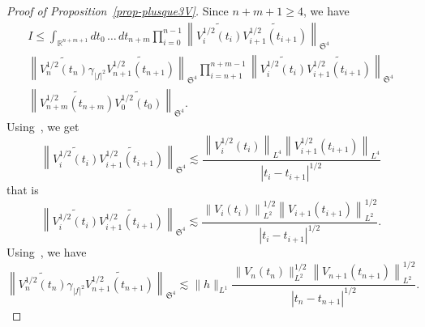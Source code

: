 \documentclass[10pt]{amsart}
\theoremstyle{definition}\newtheorem{defi}[theo]{Definition}\newtheorem{rema}[theo]{Remark}\newtheorem{exam}[theo]{Example}\newtheorem{exem}[theo]{Example}\newtheorem{nota}[theo]{Notation}
\newcommand{\R}{\mathbb{R}}
\newcommand{\frkS}{\mathfrak{S}}
\begin{document}
\begin{proof}[Proof of Proposition~\ref{prop-plusque3V}]
Since $n+m+1 \geq 4$, we have
\begin{multline*}
I \leq \int_{\R^{n+m+1}} dt_0\,\hdots\,dt_{n+m} \prod_{i=0}^{n-1} \left\|\widetilde{V_i^{1/2}(t_i)}\widetilde{V_{i+1}^{1/2}\left(t_{i+1}\right)} \right\|_{\frkS^{4}}\\
\left\|\widetilde{V_n^{1/2}(t_n)} \gamma_{|f|^2} \widetilde{V_{n+1}^{1/2}\left(t_{n+1}\right)} \right\|_{\frkS^{4}} \prod_{i=n+1}^{n+m-1}\left\| \widetilde{V_i^{1/2}(t_i)} \widetilde{V_{i+1}^{1/2}\left(t_{i+1}\right)} \right\|_{\frkS^{4}}\\\left\| \widetilde{V_{n+m}^{1/2}\left(t_{n+m}\right)} \widetilde {V_0^{1/2}(t_0)} \right\|_{\frkS^{4}}.
\end{multline*}
Using~\cite[Lemma~1 p~10]{FLLS}, we get
\[
\left\|\widetilde{V_i^{1/2}(t_i)}\widetilde{V_{i+1}^{1/2}\left(t_{i+1}\right)} \right\|_{\frkS^{4}} \lesssim \frac{\left\|V_i^{1/2}(t_i)\right\|_{L^4} \left\|V_{i+1}^{1/2}\left(t_{i+1}\right)\right\|_{L^4}}{\left|t_i-t_{i+1}\right|^{1/2}}
\]
that is
\[
\left\|\widetilde{V_i^{1/2}(t_i)}\widetilde{V_{i+1}^{1/2}\left(t_{i+1}\right)} \right\|_{\frkS^{4}} \lesssim \frac{\left\|V_i(t_i)\right\|_{L^2}^{1/2} \left\|V_{i+1}\left(t_{i+1}\right)\right\|_{L^2}^{1/2}}{\left|t_i-t_{i+1}\right|^{1/2}}.
\]
Using~\cite[Lemma~4 p~18]{lewsab2}, we have
\[
\left\|\widetilde{V_n^{1/2}(t_n)} \gamma_{|f|^2} \widetilde{V_{n+1}^{1/2}\left(t_{n+1}\right)} \right\|_{\frkS^{4}} \lesssim \|h\|_{L^1}\frac{\|V_n(t_n)\|_{L^2}^{1/2}\left\|V_{n+1}\left(t_{n+1}\right)\right\|_{L^2}^{1/2}}{\left|t_n - t_{n+1}\right|^{1/2}}.
\]


\end{proof}
\end{document}
